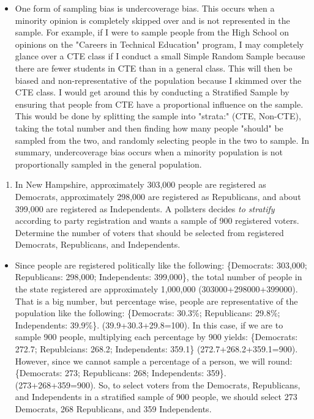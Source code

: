 \documentclass[letterpaper]{article}
\def\tightlist{}
\begin{document}
\begin{itemize}
\tightlist
\item
  One form of sampling bias is undercoverage bias. This occurs when a minority opinion is completely skipped over and is not represented in the sample. For example, if I were to sample people from the High School on opinions on the "Careers in Technical Education" program, I may completely glance over a CTE class if I conduct a small Simple Random Sample because there are fewer students in CTE than in a general class. This will then be biased and non-representative of the population because I skimmed over the CTE class. I would get around this by conducting a Stratified Sample by ensuring that people from CTE have a proportional influence on the sample. This would be done by splitting the sample into "strata:" (CTE, Non-CTE), taking the total number and then finding how many people "should" be sampled from the two, and randomly selecting people in the two to sample. In summary, undercoverage bias occurs when a minority population is not proportionally sampled in the general population.
\end{itemize}

\begin{enumerate}
\def\labelenumi{(\alph{enumi})}
\setcounter{enumi}{4}
\tightlist
\item
  In New Hampshire, approximately 303,000 people are registered as Democrats, approximately 298,000 are registered as Republicans, and about 399,000 are registered as Independents. A pollsters decides \emph{to stratify} according to party registration and wants a sample of 900 registered voters. Determine the number of voters that should be selected from registered Democrats, Republicans, and Independents.\\
\end{enumerate}

\begin{itemize}
\tightlist
\item
  Since people are registered politically like the following: \{Democrats: 303,000; Republicans: 298,000; Independents: 399,000\}, the total number of people in the state registered are approximately 1,000,000 (303000+298000+399000). That is a big number, but percentage wise, people are representative of the population like the following: \{Democrats: 30.3\%; Republicans: 29.8\%; Independents: 39.9\%\}. (39.9+30.3+29.8=100). In this case, if we are to sample 900 people, multiplying each percentage by 900 yields: \{Democrats: 272.7; Republcians: 268.2; Independents: 359.1\} (272.7+268.2+359.1=900). However, since we cannot sample a percentage of a person, we will round: \{Democrats: 273; Republicans: 268; Independents: 359\}. (273+268+359=900). So, to select voters from the Democrats, Republicans, and Independents in a stratified sample of 900 people, we should select 273 Democrats, 268 Republicans, and 359 Independents.
\end{itemize}
\end{document}
